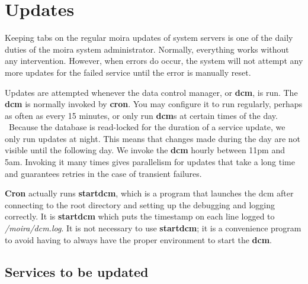\section{Updates}

Keeping tabs on the regular moira updates of system servers is one of
the daily duties of the moira system administrator.  Normally,
everything works without any intervention.  However, when errors do
occur, the system will not attempt any more updates for the failed
service until the error is manually reset.

Updates are attempted whenever the data control manager, or {\bf dcm},
is run.  The {\bf dcm} is normally invoked by {\bf cron}.  You may
configure it to run regularly, perhaps as often as every 15 minutes,
or only run {\bf dcm}s at certain times of the day.  \athena\ Because
the database is read-locked for the duration of a service update, we
only run updates at night.  This means that changes made during the
day are not visible until the following day.  We invoke the {\bf dcm}
hourly between 11pm and 5am.  Invoking it many times gives parallelism
for updates that take a long time and guarantees retries in the case
of transient failures.

{\bf Cron} actually runs {\bf startdcm}, which is a
program that launches the dcm after connecting to the root directory
and setting up the debugging and logging correctly.  It is
{\bf startdcm} which puts the timestamp on each line logged to
{\em /moira/dcm.log}.  It is not necessary to use {\bf startdcm}; it is a
convenience program to avoid having to always have the proper
environment to start the {\bf dcm}.

\subsection{Services to be updated}


